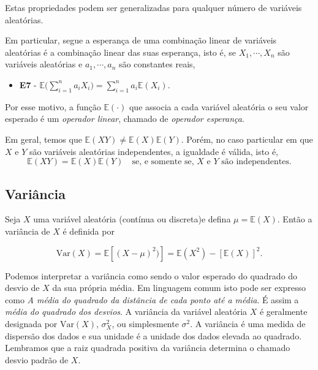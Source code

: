 \documentclass[
]{book}
\providecommand{\tightlist}{%
  \setlength{\itemsep}{0pt}\setlength{\parskip}{0pt}}
\theoremstyle{definition}
\theoremstyle{definition}
\theoremstyle{definition}
\theoremstyle{remark}
\begin{document}
Estas propriedades podem ser generalizadas para qualquer número de variáveis aleatórias.

Em particular, segue a esperança de uma combinação linear de variáveis aleatórias
é a combinação linear das suas esperança, isto é, se \(X_1,\cdots,X_n\) são variáveis aleatórias e \(a_1,\cdots,a_n\) são constantes reais,

\begin{itemize}
\tightlist
\item
  \textbf{E7} - \(\displaystyle{\mathbb{E}\bigg(\sum_{i=1}^na_iX_i\bigg)= \sum_{i=1}^na_i\mathbb{E}(X_i)}.\)
\end{itemize}

Por esse motivo, a função \(\mathbb{E}(\cdot)\) que associa a cada variável aleatória o seu valor esperado é um \emph{operador linear}, chamado de \emph{operador esperança}.

Em geral, temos que \(\mathbb{E}(X Y) \neq \mathbb{E}(X) \mathbb{E}(Y)\). Porém, no caso particular em que \(X\) e \(Y\) são variáveis aleatórias independentes, a igualdade é válida, isto é,
\[\mathbb{E}(X Y) = \mathbb{E}(X) \mathbb{E}(Y)\quad \mbox{se, e somente se, $X$ e $Y$ são independentes}.\]

\hypertarget{variuxe2ncia}{%
\subsection{Variância}\label{variuxe2ncia}}

Seja \(X\) uma variável aleatória (contínua ou discreta)e defina \(\mu = \mathbb{E}(X)\). Então a variância de \(X\) é definida por

\begin{equation}
\mbox{Var}(X)={\mathbb{E}}[(X-\mu)^2)]=\mathbb{E}(X^2)-[\mathbb{E}(X)]^2.
\label{eq:var}
\end{equation}

Podemos interpretar a variância como sendo o valor esperado do quadrado do desvio de \(X\) da sua própria média. Em linguagem comum isto pode ser expresso como \emph{A média do quadrado da distância de cada ponto até a média}. É assim a \emph{média do quadrado dos desvios}. A variância da variável aleatória \(X\) é geralmente designada por \(\mbox{Var}(X)\), \(\sigma^2_X\), ou simplesmente \(\sigma^2\). A variância é uma medida de dispersão dos dados e sua unidade é a unidade dos dados elevada ao quadrado. Lembramos que a raiz quadrada positiva da variância determina o chamado desvio padrão de \(X\).
\end{document}
